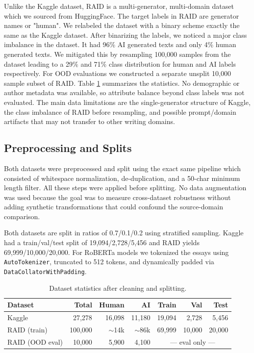 \documentclass{article}
\begin{document}
Unlike the Kaggle dataset, RAID \citep{dugan2024raid} is a multi-generator, multi-domain dataset which we sourced from HuggingFace. The target labels in RAID are generator names or "human". We relabeled the dataset with a binary scheme exactly the same as the Kaggle dataset. After binarizing the labels, we noticed a major class imbalance in the dataset. It had 96\% AI generated texts and only 4\% human generated texts. We mitigated this by resampling 100,000 samples from the dataset leading to a 29\% and 71\% class distribution for human and AI labels respectively. For OOD evaluations we constructed a separate unsplit 10,000 sample subset of RAID. Table \ref{tab:data} summarizes the statistics. No demographic or author metadata was available, so attribute balance beyond class labels was not evaluated. The main data limitations are the single-generator structure of Kaggle, the class imbalance of RAID before resampling, and possible prompt/domain artifacts that may not transfer to other writing domains.


\subsection{Preprocessing and Splits}
Both datasets were preprocessed and split using the exact same pipeline which consisted of whitespace normalization, de-duplication, and a 50-char minimum length filter. All these steps were applied before splitting. No data augmentation was used because the goal was to measure cross-dataset robustness without adding synthetic transformations that could confound the source-domain comparison.

Both datasets are split in ratios of 0.7/0.1/0.2 using stratified sampling. Kaggle had a train/val/test split of 19,094/2,728/5,456 and RAID yields 69,999/10,000/20,000. For RoBERTa models we tokenized the essays using \texttt{AutoTokenizer}, truncated to 512 tokens, and dynamically padded via \texttt{DataCollatorWithPadding}.
\begin{table}[H]
    \centering
    \caption{Dataset statistics after cleaning and splitting.}
    \label{tab:data}
    \footnotesize
    \begin{tabular}{@{}lrrrrrr@{}}
        \toprule
        Dataset         & Total   & Human     & AI        & Train                                 & Val    & Test   \\
        \midrule
        Kaggle          & 27,278  & 16,098    & 11,180    & 19,094                                & 2,728  & 5,456  \\
        RAID (train)    & 100,000 & $\sim$14k & $\sim$86k & 69,999                                & 10,000 & 20,000 \\
        RAID (OOD eval) & 10,000  & 5,900     & 4,100     & \multicolumn{3}{c}{--- eval only ---}                   \\
        \bottomrule
    \end{tabular}
\end{table}
\end{document}
